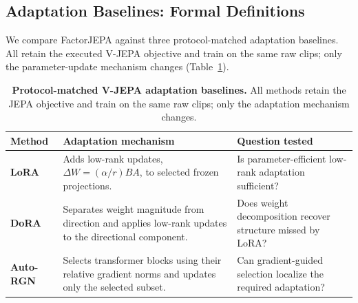 \subsection{Adaptation Baselines: Formal Definitions}
\label{app:adaptation_baseline_defs}

We compare FactorJEPA against three protocol-matched adaptation baselines.
All retain the executed V-JEPA objective and train on the same raw clips;
only the parameter-update mechanism changes
(Table~\ref{tab:vjepa_adaptation_baselines}).

\begin{table}[ht!]
\centering
\caption{
\textbf{Protocol-matched V-JEPA adaptation baselines.}
All methods retain the JEPA objective and train on the same raw clips; only the adaptation mechanism changes.
}
\label{tab:vjepa_adaptation_baselines}
\scriptsize
\setlength{\tabcolsep}{3pt}
\renewcommand{\arraystretch}{1.08}
\begin{tabular}{
    p{}
    p{}
    p{}
}
\toprule
\textbf{Method} & \textbf{Adaptation mechanism} & \textbf{Question tested} \\
\midrule

\textbf{LoRA}~\cite{hu2022lora}
&
Adds low-rank updates,
$\Delta W=(\alpha/r)BA$, to selected frozen projections.
&
Is parameter-efficient low-rank adaptation sufficient?
\\
\midrule

\textbf{DoRA}~\cite{liu2024dora}
&
Separates weight magnitude from direction and applies low-rank updates to the directional component.
&
Does weight decomposition recover structure missed by LoRA?
\\
\midrule

\textbf{Auto-RGN}~\cite{lee2023surgical}
&
Selects transformer blocks using their relative gradient norms and updates only the selected subset.
&
Can gradient-guided selection localize the required adaptation?
\\

\bottomrule
\end{tabular}
\end{table}

